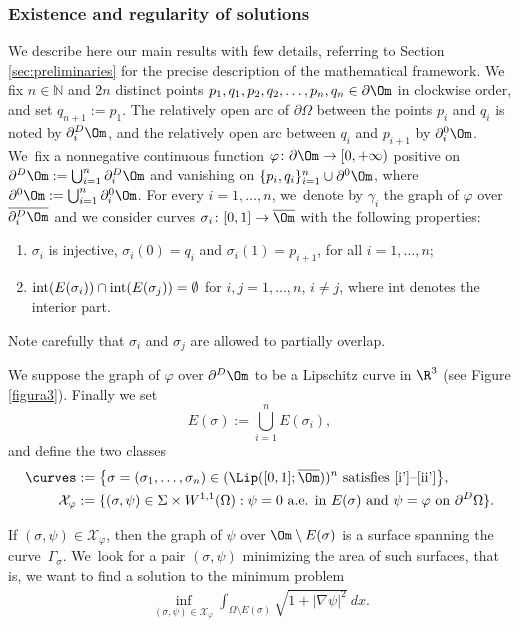 \subsubsection*{Existence and regularity of solutions}
We describe here our main results with few details, referring to Section \ref{sec:preliminaries}
for the precise description of the mathematical framework.
We
fix $n\in\mathbb N$ and $2n$ distinct points
$p_1,q_1,p_2,q_2,\dots,p_n,q_n \in \partial
\Om$
in clockwise order,
and set $q_{n+1}:=p_1$. The relatively
open arc
of $\partial \Omega$ between the points $p_i$ and $q_i$ is noted by $\partial_i^D\Om$,
and the relatively open
arc between $q_i$ and $p_{i+1}$ by $\partial_i^0\Om$. We~fix a nonnegative
continuous function $\varphi\colon\partial\Om\to[0,+\infty)$
positive on $\partial^D\Om:=\bigcup_{i=1}^n\partial^D_i\Om$ and vanishing
on $\{p_i,q_i\}_{i=1}^n\cup\partial^0\Om$, where $\partial^0\Om:=\bigcup_{i=1}^n\partial^0_i\Om$. For every $i=1,\dots,n$, we~denote by $\gamma_i$ the graph of $\varphi$ over $\overline {\partial^D_i\Om}$
and we consider curves $\sigma_i\colon[0,1]\to\overline \Om$
with the following properties:
\begin{enumerate}[label=(\roman*),wide]
\item{\label{i'}} $\sigma_i$ is injective, $\sigma_i(0)=q_i$ and $\sigma_i(1)=p_{i+1}$, for all $i=1,\dots,n$;
\item{\label{ii'}}
$\textup{int}(E(\sigma_i))\cap \textup{int}(E(\sigma_j))= \emptyset$
for $i,j=1,\dots,n$, $i \neq j$, where int denotes the interior part.
\end{enumerate}
Note carefully that $\sigma_i$ and $\sigma_j$ are allowed
to partially overlap.

We suppose the graph of $\varphi$ over $\partial^D\Om$ to be a Lipschitz curve in $\R^3$ (see Figure \ref{figura3}). Finally we
set
\begin{equation}\label{def:E}
E(\sigma):=\bigcup_{i=1}^n E(\sigma_i),
\end{equation}
and define the two classes
\begin{align}
\curves&:=\big\{\sigma = (\sigma_1,\dots,\sigma_n)
\in (\Lip([0,1]; \overline\Om))^n \text{ satisfies \ref{i'}--\ref{ii'}}\big\},\label{Sigma}
\\
\mathcal X_\varphi&:=\{(\sigma,\psi)\in \Sigma\times W^{1,1}(\Omega):\psi=0\text{ a.e. in }E(\sigma)\text{ and }\psi=\varphi\text{ on }\partial^D\Omega\}.
\label{chi}
\end{align}

If $(\sigma,\psi)\in \mathcal X_\varphi$, then the graph of $\psi$ over $\Om\setminus E(\sigma)$ is a surface spanning the curve~$\Gamma_\sigma$. We~look for a pair
$(\sigma,\psi)$ minimizing the area of such surfaces, that is, we
want to find a solution to the minimum problem
\begin{align}\label{problem1}
\inf_{(\sigma,\psi)\in \mathcal X_\varphi}
\int_{\Omega\setminus E(\sigma)}\sqrt{1+|\nabla \psi|^2}~dx.
\end{align}

